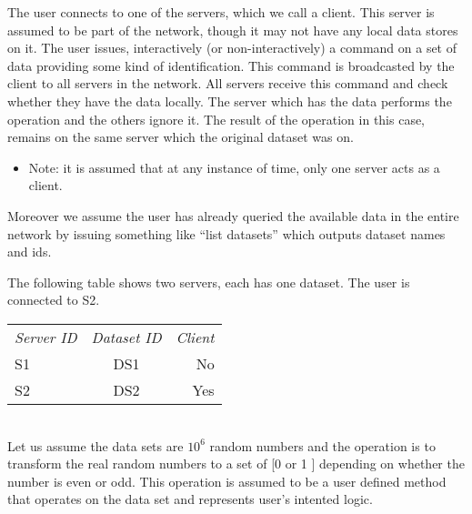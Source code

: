 
The user connects to one of the servers, which we call a client. This server is assumed to be part 
of the network, though it may not have any local data stores on it. The user issues, interactively
(or non-interactively) a command on a set of data providing some kind of identification. This command
is broadcasted by the client to all servers in the network. All servers receive this command and check
whether they have the data locally. The server which has the data performs the operation and the others
ignore it. The result of the operation in this case, remains on the same server which the original 
dataset was on. 

\begin{itemize}
\item Note: it is assumed that at any instance of time, only one server acts as a client.
\end{itemize}

Moreover we assume the user has already queried the available data in the entire network by 
issuing something like “list datasets” which outputs dataset names and ids.

The following table shows two servers, each has one dataset. The user is connected to S2.\\

\begin{tabular}{ l c r }
\em{Server ID} & \em{ Dataset ID} & \em{ Client} \\
S1 & DS1 & No \\
S2 & DS2 & Yes \\
\end{tabular}\\

Let us assume the data sets are \(10^6\) random numbers and
the operation is to transform the real random numbers to a set of [0 or 1 ] depending on whether the number is even or odd. 
This operation is assumed to be a user defined method that operates on the data set and 
represents user's intented logic.

